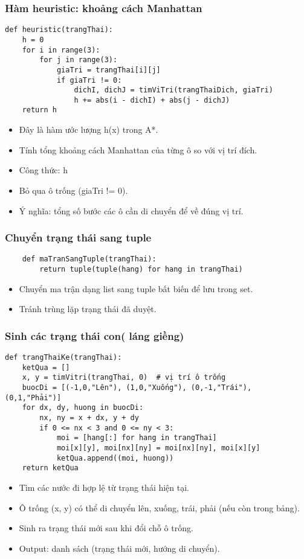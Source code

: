 \documentclass{article}
\begin{document}
\subsubsection{Hàm heuristic: khoảng cách Manhattan}
\begin{verbatim}
def heuristic(trangThai):
    h = 0
    for i in range(3):
        for j in range(3):
            giaTri = trangThai[i][j]
            if giaTri != 0:
                dichI, dichJ = timViTri(trangThaiDich, giaTri)
                h += abs(i - dichI) + abs(j - dichJ)
    return h
\end{verbatim}
\begin{itemize}
    \item Đây là hàm ước lượng h(x) trong A*.
    \item Tính tổng khoảng cách Manhattan của từng ô so với vị trí đích.
    \item Công thức: h
    \item Bỏ qua ô trống (giaTri != 0).
    \item Ý nghĩa: tổng số bước các ô cần di chuyển để về đúng vị trí.
\end{itemize}

\subsubsection{Chuyển trạng thái sang tuple}
\begin{verbatim}
    def maTranSangTuple(trangThai):
        return tuple(tuple(hang) for hang in trangThai)
\end{verbatim}
\begin{itemize}
    \item Chuyển ma trận dạng list sang tuple bất biến để lưu trong set.
    
    \item Tránh trùng lặp trạng thái đã duyệt.

\end{itemize}
\subsubsection{Sinh các trạng thái con( láng giềng) }
\begin{verbatim}
def trangThaiKe(trangThai):
    ketQua = []
    x, y = timVitri(trangThai, 0)  # vị trí ô trống
    buocDi = [(-1,0,"Lên"), (1,0,"Xuống"), (0,-1,"Trái"), (0,1,"Phải")]
    for dx, dy, huong in buocDi:
        nx, ny = x + dx, y + dy
        if 0 <= nx < 3 and 0 <= ny < 3:
            moi = [hang[:] for hang in trangThai]
            moi[x][y], moi[nx][ny] = moi[nx][ny], moi[x][y]
            ketQua.append((moi, huong))
    return ketQua
\end{verbatim}
\begin{itemize}
    \item Tìm các nước đi hợp lệ từ trạng thái hiện tại.
    \item Ô trống (x, y) có thể di chuyển lên, xuống, trái, phải (nếu còn trong bảng).
    \item Sinh ra trạng thái mới sau khi đổi chỗ ô trống.
    \item Output: danh sách (trạng thái mới, hướng di chuyển).

\end{itemize}
\end{document}
